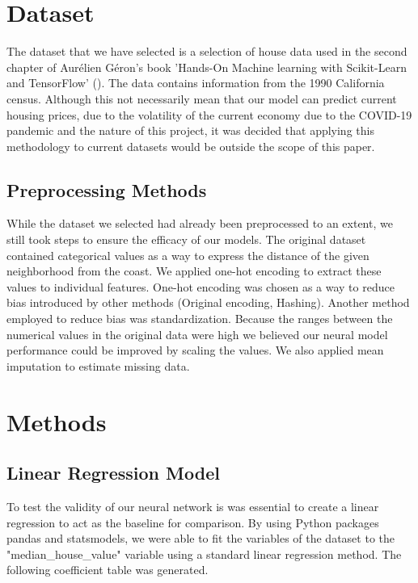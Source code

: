 \documentclass[11pt]{article}
\begin{document}
\section{Dataset}

The dataset that we have selected is a selection of house data used in the second chapter of Aurélien Géron's book 'Hands-On Machine learning with Scikit-Learn and TensorFlow'  (\citeyear{Geron2022}). The data contains information from the 1990 California census. Although this not necessarily mean that our model can predict current housing prices, due to the volatility of the current economy due to the COVID-19 pandemic and the nature of this project, it was decided that applying this methodology to current datasets would be outside the scope of this paper.

\subsection{Preprocessing Methods}

While the dataset we selected had already been preprocessed to an extent, we still took steps to ensure the efficacy of our models. The original dataset contained categorical values as a way to express the distance of the given neighborhood from the coast. 
We applied one-hot encoding to extract these values to individual features. One-hot encoding was chosen as a way to reduce bias introduced by other methods (Original encoding, Hashing). Another method employed to reduce bias was standardization. Because the ranges between the numerical values in the original data were high we believed our neural model performance could be improved by scaling the values. We also applied mean imputation to estimate missing data.


\section{Methods}

\subsection{Linear Regression Model}

To test the validity of our neural network is was essential to create a linear regression to act as the baseline for comparison. By using Python packages pandas and statsmodels, we were able to fit the variables of the dataset to the "median\_house\_value" variable using a standard linear regression method. The following coefficient table was generated.
\end{document}
